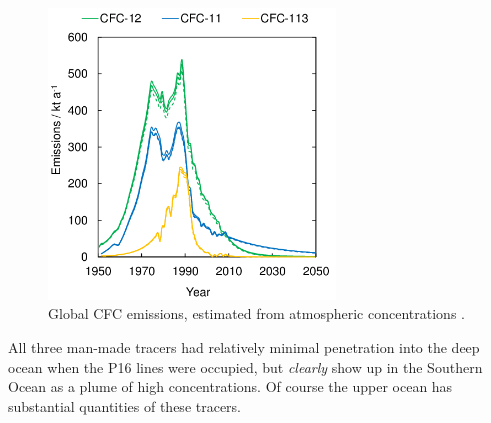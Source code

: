 \begin{figure}[hbt]
  \begin{center}
    \includegraphics[width=3in]{figs/WaterMasses/Emissions-estimates-for-CFC-11-blue-CFC-12-green-and-CFC-113-orange-based-on.png}
    \caption{Global CFC emissions, estimated from atmospheric concentrations \citep{Allin_2015}.}
    \label{fig:CFCEmmisions}  
  \end{center}
\end{figure}

All three man-made tracers had relatively minimal penetration into the  deep ocean when the P16 lines were occupied, but \emph{clearly} show up in the Southern Ocean as a plume of high concentrations.  Of course the upper ocean has substantial quantities of these tracers.  


